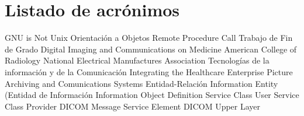 \chapter{Listado de acrónimos}

{\small
\begin{acronym}[XXXXXXXX]
       {\acs{GNU} is Not Unix}
        {Orientación a Objetos}
       {Remote Procedure Call}
       {Trabajo de Fin de Grado}
     {Digital Imaging and Communications on Medicine}
       {American College of Radiology}
      {National Electrical Manufactures Association}
       {Tecnologías de la información y de la Comunicación}
       {Integrating the Healthcare Enterprise}
      {Picture Archiving and Comunications Systems}
        {Entidad-Relación}
        {Information Entity (Entidad de Información}
       {Information Object Definition}
       {Service Class User}
       {Service Class Provider}
     {DICOM Message Service Element}
     {DICOM Upper Layer}
\end{acronym}
}





